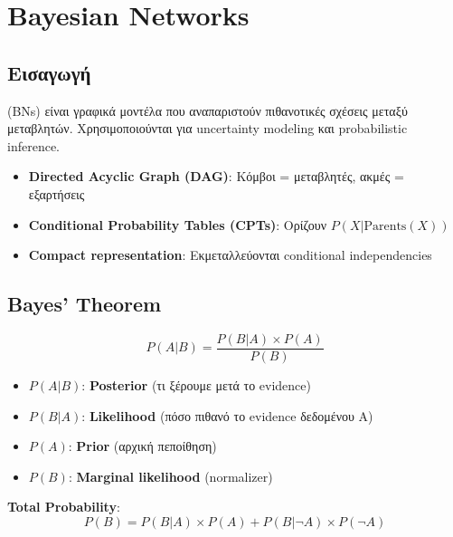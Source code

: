 
\chapter{Bayesian Networks}

\section{Εισαγωγή}

 (BNs) είναι γραφικά μοντέλα που αναπαριστούν πιθανοτικές σχέσεις μεταξύ μεταβλητών. Χρησιμοποιούνται για uncertainty modeling και probabilistic inference.

\begin{definitionbox}
\begin{itemize}
    \item \textbf{Directed Acyclic Graph (DAG)}: Κόμβοι = μεταβλητές, ακμές = εξαρτήσεις
    \item \textbf{Conditional Probability Tables (CPTs)}: Ορίζουν $P(X | \text{Parents}(X))$
    \item \textbf{Compact representation}: Εκμεταλλεύονται conditional independencies
\end{itemize}
\end{definitionbox}

\section{Bayes' Theorem}

\begin{formulabox}
\begin{equation}
P(A|B) = \frac{P(B|A) \times P(A)}{P(B)}
\end{equation}

\begin{itemize}
    \item $P(A|B)$: \textbf{Posterior} (τι ξέρουμε μετά το evidence)
    \item $P(B|A)$: \textbf{Likelihood} (πόσο πιθανό το evidence δεδομένου A)
    \item $P(A)$: \textbf{Prior} (αρχική πεποίθηση)
    \item $P(B)$: \textbf{Marginal likelihood} (normalizer)
\end{itemize}

\textbf{Total Probability}:
\begin{equation}
P(B) = P(B|A) \times P(A) + P(B|\neg A) \times P(\neg A)
\end{equation}
\end{formulabox}

